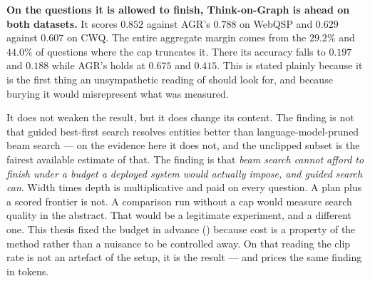 \begin{table}[!tb]
  \begin{center}
    \caption[The agentic-baseline comparison, split on budget clipping]{The
    comparison against the agentic baseline, split on whether the shared
    $25$-call cap truncated it. Clipping is read from the per-record
    \textsf{budget\_exhausted} trace flag rather than from a call count, since a
    run may spend its last permitted call on the step that finishes it. The
    \emph{combined} rows reproduce the Hits@1 column of ,
    recomputed independently from the raw records. Generated from
    \textsf{results/phase4/thesis\_numbers.json}.}
    \label{tab:tog-split}
    \small
    
  \end{center}
\end{table}

\textbf{On the questions it is allowed to finish, Think-on-Graph is ahead on
both datasets.} It scores $0.852$ against AGR's $0.788$ on WebQSP and $0.629$
against $0.607$ on CWQ. The entire aggregate margin comes from the $29.2\%$ and
$44.0\%$ of questions where the cap truncates it. There its accuracy falls
to $0.197$ and $0.188$ while AGR's holds at $0.675$ and $0.415$. This is stated
plainly because it is the first thing an unsympathetic reading of
 should look for, and because burying it would misrepresent
what was measured.

It does not weaken the result, but it does change its content. The finding is
not that guided best-first search resolves entities better than
language-model-pruned beam search --- on the evidence here it does not, and the
unclipped subset is the fairest available estimate of that. The finding is that
\emph{beam search cannot afford to finish under a budget a deployed system would
actually impose, and guided search can}. Width times depth is multiplicative and
paid on every question. A plan plus a scored frontier is not. A comparison run
without a cap would measure search quality in the abstract. That would be a
legitimate experiment, and a different one. This thesis fixed the budget in
advance () because cost is a property of the method rather
than a nuisance to be controlled away. On that reading the clip rate is not an
artefact of the setup, it is the result --- and  prices the
same finding in tokens.

